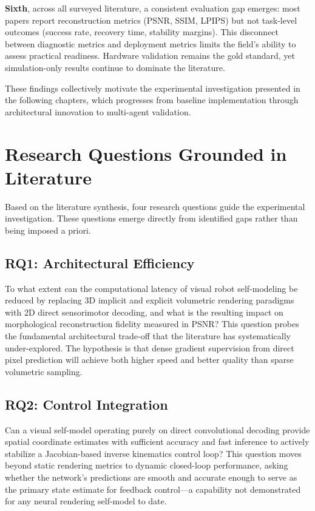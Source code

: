 \documentclass[12pt,a4paper,oneside]{report}
\begin{document}
\textbf{Sixth}, across all surveyed literature, a consistent evaluation gap emerges: most papers report reconstruction metrics (PSNR, SSIM, LPIPS) but not task-level outcomes (success rate, recovery time, stability margins). This disconnect between diagnostic metrics and deployment metrics limits the field's ability to assess practical readiness. Hardware validation remains the gold standard, yet simulation-only results continue to dominate the literature.

These findings collectively motivate the experimental investigation presented in the following chapters, which progresses from baseline implementation through architectural innovation to multi-agent validation.

\section{Research Questions Grounded in Literature}

Based on the literature synthesis, four research questions guide the experimental investigation. These questions emerge directly from identified gaps rather than being imposed a priori.

\subsection{RQ1: Architectural Efficiency}

To what extent can the computational latency of visual robot self-modeling be reduced by replacing 3D implicit and explicit volumetric rendering paradigms with 2D direct sensorimotor decoding, and what is the resulting impact on morphological reconstruction fidelity measured in PSNR? This question probes the fundamental architectural trade-off that the literature has systematically under-explored. The hypothesis is that dense gradient supervision from direct pixel prediction will achieve both higher speed and better quality than sparse volumetric sampling.

\subsection{RQ2: Control Integration}

Can a visual self-model operating purely on direct convolutional decoding provide spatial coordinate estimates with sufficient accuracy and fast inference to actively stabilize a Jacobian-based inverse kinematics control loop? This question moves beyond static rendering metrics to dynamic closed-loop performance, asking whether the network's predictions are smooth and accurate enough to serve as the primary state estimate for feedback control—a capability not demonstrated for any neural rendering self-model to date.
\end{document}
